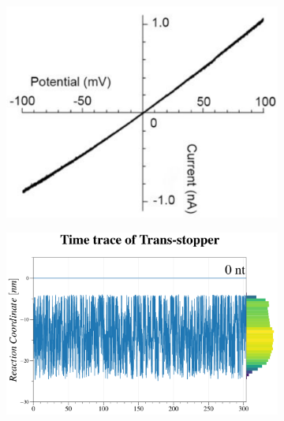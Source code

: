 \begin{figure}[ht!]

  \begin{centering}
  \begin{subfigure}[t]{\dimexpr.29\linewidth-1.3em\relax}
  \centering
  \vspace{0.35cm}
  \includegraphics[width=1.05\linewidth,valign=t]{Figures/IV-100.png}
  \end{subfigure}%
  \begin{subfigure}[t]{\dimexpr.46\linewidth-1.3em\relax}
  \centering
  \hspace{-0.2cm}
  \vspace{0.1cm}
  \includegraphics[width=0.95\linewidth,valign=t]{Figures/MR-100.png}

\end{subfigure}
\end{centering}
\end{figure}
